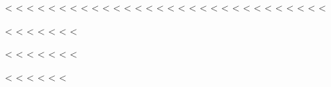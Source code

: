 <%
<%
<%
<%
<%
<%
<%
<%
<%
<%
<%
<%
<%
<%
<%
<%
<%
<%
<%
<%
<%
<%
<%
<%
<%
<%
<%
<%
<%
<%

<%
<%
<%
<%
<%
<%
<%

<%
<%
<%
<%
<%
<%
<%

<%
<%
<%
<%
<%
<%

